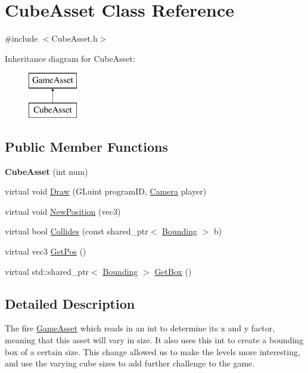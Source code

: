 \hypertarget{classCubeAsset}{\section{Cube\-Asset Class Reference}
\label{classCubeAsset}
}


{\ttfamily \#include $<$Cube\-Asset.\-h$>$}

Inheritance diagram for Cube\-Asset\-:\begin{figure}[H]
\begin{center}
\leavevmode
\includegraphics[height=2.000000cm]{classCubeAsset}
\end{center}
\end{figure}
\subsection*{Public Member Functions}
\begin{DoxyCompactItemize}
\item 
\hypertarget{classCubeAsset_a9eb4b26fb2bab2c821cf8566b44dabb8}{{\bfseries Cube\-Asset} (int num)}\label{classCubeAsset_a9eb4b26fb2bab2c821cf8566b44dabb8}

\item 
virtual void \hyperlink{classCubeAsset_a7396ae86ceb988edd1fb9b21903cdaa4}{Draw} (G\-Luint program\-I\-D, \hyperlink{classCamera}{Camera} player)
\item 
virtual void \hyperlink{classCubeAsset_a4a934009bd945ac659b2658400af505d}{New\-Position} (vec3)
\item 
virtual bool \hyperlink{classCubeAsset_a4ee70be683d43e15041ee1cfb44cc0f4}{Collides} (const shared\-\_\-ptr$<$ \hyperlink{classBounding}{Bounding} $>$ b)
\item 
virtual vec3 \hyperlink{classCubeAsset_a82c603031c83dce2921aa2611e5385c7}{Get\-Pos} ()
\item 
virtual std\-::shared\-\_\-ptr$<$ \hyperlink{classBounding}{Bounding} $>$ \hyperlink{classCubeAsset_a8de727c3264ddba5167b2cf453258eb1}{Get\-Box} ()
\end{DoxyCompactItemize}


\subsection{Detailed Description}
The fire \hyperlink{classGameAsset}{Game\-Asset} which reads in an int to determine its x and y factor, meaning that this asset will vary in size. It also uses this int to create a bounding box of a certain size. This change allowed us to make the levels more interesting, and use the varying cube sizes to add further challenge to the game. 

